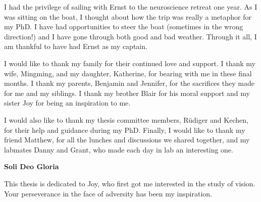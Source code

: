 \begin{frontmatter}
\begin{abstract}
\end{abstract}

\begin{acknowledgment}

I had the privilege of sailing with Ernst to the neuroscience retreat one year. As I was sitting on the boat, I thought about how the trip was really a metaphor for my PhD. I have had opportunities to steer the boat (sometimes in the wrong direction!) and I have gone through both good and bad weather. Through it all, I am thankful to have had Ernst as my captain.

I would like to thank my family for their continued love and support. I thank my wife, Mingming, and my daughter, Katherine, for bearing with me in these final months. I thank my parents, Benjamin and Jennifer, for the sacrifices they made for me and my siblings. I thank my brother Blair for his moral support and my sister Joy for being an inspiration to me.

I would also like to thank my thesis committee members, R{\"u}diger and Kechen, for their help and guidance during my PhD. Finally, I would like to thank my friend Matthew, for all the lunches and discussions we shared together, and my labmates Danny and Grant, who made each day in lab an interesting one.

\textbf{Soli Deo Gloria}

\vspace{-1cm} %

\end{acknowledgment}

\begin{dedication}
 
This thesis is dedicated to Joy, who first got me interested in the study of vision. Your perseverance in the face of adversity has been my inspiration.

\end{dedication}

\tableofcontents

\listoftables

\listoffigures

\end{frontmatter}

